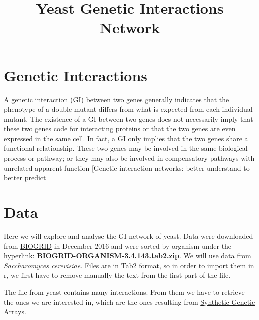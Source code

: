 \documentclass[12pt,]{article}
\title{Yeast Genetic Interactions Network}
\author{}
\date{}
\newenvironment{Shaded}{\begin{snugshade}}{\end{snugshade}}
\newcommand{\KeywordTok}[1]{\textcolor[rgb]{0.13,0.29,0.53}{\textbf{{#1}}}}
\newcommand{\NormalTok}[1]{{#1}}
\begin{document}
\maketitle

{
\setcounter{tocdepth}{2}
\tableofcontents
}
\section{Genetic Interactions}\label{genetic-interactions}

A genetic interaction (GI) between two genes generally indicates that
the phenotype of a double mutant differs from what is expected from each
individual mutant. The existence of a GI between two genes does not
necessarily imply that these two genes code for interacting proteins or
that the two genes are even expressed in the same cell. In fact, a GI
only implies that the two genes share a functional relationship. These
two genes may be involved in the same biological process or pathway; or
they may also be involved in compensatory pathways with unrelated
apparent function {[}Genetic interaction networks: better understand to
better predict{]}

\section{Data}\label{data}

Here we will explore and analyse the GI network of yeast. Data were
downloaded from \href{https://thebiogrid.org/download.php}{BIOGRID} in
December 2016 and were sorted by organism under the hyperlink:
\textbf{BIOGRID-ORGANISM-3.4.143.tab2.zip}. We will use data from
\emph{Saccharomyces cerevisiae}. Files are in Tab2 format, so in order
to import them in r, we first have to remove manually the text from the
first part of the file.

The file from yeast contains many interactions. From them we have to
retrieve the ones we are interested in, which are the ones resulting
from
\href{https://en.wikipedia.org/wiki/Synthetic_genetic_array}{Synthetic
Genetic Arrays}.

\begin{Shaded}
\end{Shaded}
\end{document}
